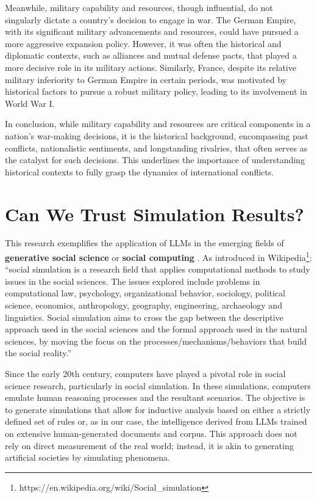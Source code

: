 \documentclass{article}
\begin{document}
Meanwhile, military capability and resources, though influential, do not singularly dictate a country's decision to engage in war. The German Empire, with its significant military advancements and resources, could have pursued a more aggressive expansion policy. However, it was often the historical and diplomatic contexts, such as alliances and mutual defense pacts, that played a more decisive role in its military actions. Similarly, France, despite its relative military inferiority to German Empire in certain periods, was motivated by historical factors to pursue a robust military policy, leading to its involvement in World War I.

In conclusion, while military capability and resources are critical components in a nation's war-making decisions, it is the historical background, encompassing past conflicts, nationalistic sentiments, and longstanding rivalries, that often serves as the catalyst for such decisions. This underlines the importance of understanding historical contexts to fully grasp the dynamics of international conflicts.

\section{Can We Trust Simulation Results?}
This research exemplifies the application of LLMs in the emerging fields of \textbf{generative social science} or \textbf{social computing} \cite{epstein2023inverse, dal2002multi, polhill2007open, national2006defense, stauffer2002sociophysics, sun2006cognition}. As introduced in Wikipedia\footnote{https://en.wikipedia.org/wiki/Social\_simulation}: ``social simulation is a research field that applies computational methods to study issues in the social sciences. The issues explored include problems in computational law, psychology, organizational behavior, sociology, political science, economics, anthropology, geography, engineering, archaeology and linguistics. Social simulation aims to cross the gap between the descriptive approach used in the social sciences and the formal approach used in the natural sciences, by moving the focus on the processes/mechanisms/behaviors that build the social reality.''

Since the early 20th century, computers have played a pivotal role in social science research, particularly in social simulation. In these simulations, computers emulate human reasoning processes and the resultant scenarios. The objective is to generate simulations that allow for inductive analysis based on either a strictly defined set of rules or, as in our case, the intelligence derived from LLMs trained on extensive human-generated documents and corpus. This approach does not rely on direct measurement of the real world; instead, it is akin to generating artificial societies by simulating phenomena.
\end{document}
